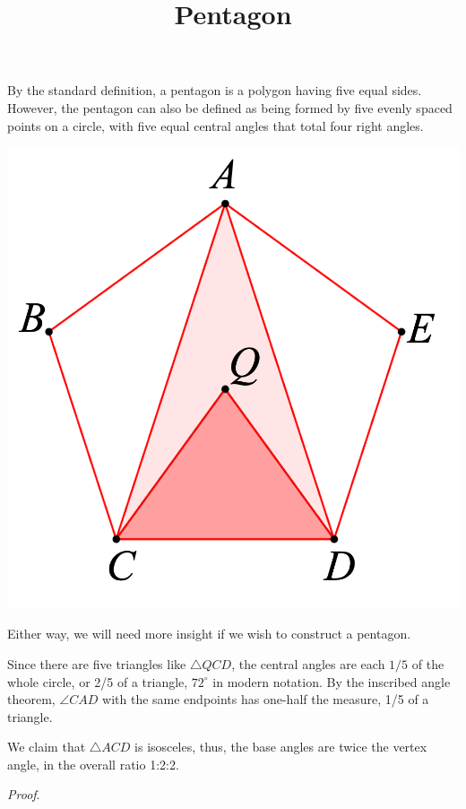 \documentclass[11pt, oneside]{article}
\title{Pentagon}
\date{}
\begin{document}
\maketitle
\Large


By the standard definition, a pentagon is a polygon having five equal sides.  However, the pentagon can also be defined as being formed by five evenly spaced points on a circle, with five equal central angles that total four right angles.
\begin{center} \includegraphics [scale=0.3] {pent_central_label.png} \end{center}

Either way, we will need more insight if we wish to construct a pentagon.

Since there are five triangles like $\triangle QCD$, the central angles are each $1/5$ of the whole circle, or 2/5 of a triangle, $72^\circ$ in modern notation.  By the inscribed angle theorem, $\angle CAD$ with the same endpoints has one-half the measure, 1/5 of a triangle.  

We claim that $\triangle ACD$ is isosceles, thus, the base angles are twice the vertex angle, in the overall ratio 1:2:2.  

\emph{Proof}.  
\end{document}
